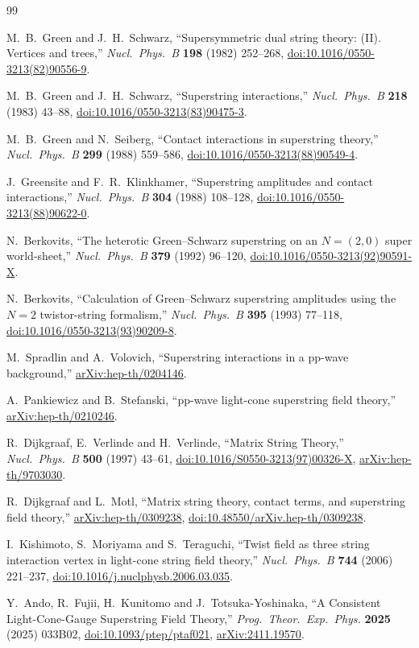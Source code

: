 \documentclass[11pt]{article}
\numberwithin{equation}{section}
\newcommand{\arxiv}[1]{\href{https://arxiv.org/abs/#1}{arXiv:#1}}
\newcommand{\doi}[1]{\href{https://doi.org/#1}{doi:#1}}
\begin{document}
\begin{thebibliography}{99}

M.~B.~Green and J.~H.~Schwarz,
``Supersymmetric dual string theory: (II). Vertices and trees,''
\emph{Nucl.\ Phys.\ B} \textbf{198} (1982) 252--268,
\doi{10.1016/0550-3213(82)90556-9}.

M.~B.~Green and J.~H.~Schwarz,
``Superstring interactions,''
\emph{Nucl.\ Phys.\ B} \textbf{218} (1983) 43--88,
\doi{10.1016/0550-3213(83)90475-3}.

M.~B.~Green and N.~Seiberg,
``Contact interactions in superstring theory,''
\emph{Nucl.\ Phys.\ B} \textbf{299} (1988) 559--586,
\doi{10.1016/0550-3213(88)90549-4}.

J.~Greensite and F.~R.~Klinkhamer,
``Superstring amplitudes and contact interactions,''
\emph{Nucl.\ Phys.\ B} \textbf{304} (1988) 108--128,
\doi{10.1016/0550-3213(88)90622-0}.

N.~Berkovits,
``The heterotic Green--Schwarz superstring on an $N=(2,0)$ super world-sheet,''
\emph{Nucl.\ Phys.\ B} \textbf{379} (1992) 96--120,
\doi{10.1016/0550-3213(92)90591-X}.

N.~Berkovits,
``Calculation of Green--Schwarz superstring amplitudes using the $N=2$ twistor-string formalism,''
\emph{Nucl.\ Phys.\ B} \textbf{395} (1993) 77--118,
\doi{10.1016/0550-3213(93)90209-8}.

M.~Spradlin and A.~Volovich,
``Superstring interactions in a pp-wave background,''
\arxiv{hep-th/0204146}.

A.~Pankiewicz and B.~Stefanski,
``pp-wave light-cone superstring field theory,''
\arxiv{hep-th/0210246}.

R.~Dijkgraaf, E.~Verlinde and H.~Verlinde,
``Matrix String Theory,''
\emph{Nucl.\ Phys.\ B} \textbf{500} (1997) 43--61,
\doi{10.1016/S0550-3213(97)00326-X},
\arxiv{hep-th/9703030}.

R.~Dijkgraaf and L.~Motl,
``Matrix string theory, contact terms, and superstring field theory,''
\arxiv{hep-th/0309238},
\doi{10.48550/arXiv.hep-th/0309238}.

I.~Kishimoto, S.~Moriyama and S.~Teraguchi,
``Twist field as three string interaction vertex in light-cone string field theory,''
\emph{Nucl.\ Phys.\ B} \textbf{744} (2006) 221--237,
\doi{10.1016/j.nuclphysb.2006.03.035}.

Y.~Ando, R.~Fujii, H.~Kunitomo and J.~Totsuka-Yoshinaka,
``A Consistent Light-Cone-Gauge Superstring Field Theory,''
\emph{Prog.\ Theor.\ Exp.\ Phys.} \textbf{2025} (2025) 033B02,
\doi{10.1093/ptep/ptaf021},
\arxiv{2411.19570}.

\end{thebibliography}
\end{document}
